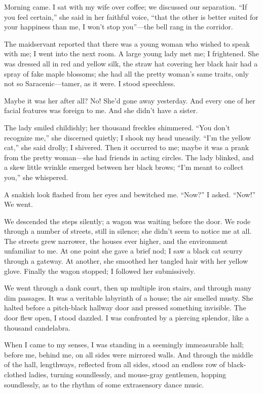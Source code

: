 \documentclass[12pt,a4paper]{article}
\begin{document}
Morning came. I sat with my wife over coffee; we discussed our separation. “If you feel certain,” she said in her faithful voice, “that the other is better suited for your happiness than me, I won’t stop you”—the bell rang in the corridor.

The maidservant reported that there was a young woman who wished to speak with me; I went into the next room. A large young lady met me; I frightened. She was dressed all in red and yellow silk, the straw hat covering her black hair had a spray of fake maple blossoms; she had all the pretty woman’s same traits, only not so Saracenic—tamer, as it were. I stood speechless.

Maybe it was her after all? No! She’d gone away yesterday. And every one of her facial features was foreign to me. And she didn’t have a sister.

The lady smiled childishly; her thousand freckles shimmered. “You don’t recognize me,” she discerned quietly; I shook my head uneasily. “I’m the yellow cat,” she said drolly; I shivered. Then it occurred to me; maybe it was a prank from the pretty woman—she had friends in acting circles. The lady blinked, and a skew little wrinkle emerged between her black brows; “I’m meant to collect you,” she whispered.

A snakish look flashed from her eyes and bewitched me. “Now?” I asked. “Now!” We went.

We descended the steps silently; a wagon was waiting before the door. We rode through a number of streets, still in silence; she didn’t seem to notice me at all. The streets grew narrower, the houses ever higher, and the environment unfamiliar to me. At one point she gave a brief nod; I saw a black cat scurry through a gateway. At another, she smoothed her tangled hair with her yellow glove. Finally the wagon stopped; I followed her submissively.

We went through a dank court, then up multiple iron stairs, and through many dim passages. It was a veritable labyrinth of a house; the air smelled musty. She halted before a pitch-black hallway door and pressed something invisible. The door flew open, I stood dazzled. I was confronted by a piercing splendor, like a thousand candelabra.

When I came to my senses, I was standing in a seemingly immeasurable hall; before me, behind me, on all sides were mirrored walls. And through the middle of the hall, lengthways, reflected from all sides, stood an endless row of black-clothed ladies, turning soundlessly, and mouse-gray gentlemen, hopping soundlessly, as to the rhythm of some extrasensory dance music.
\end{document}
